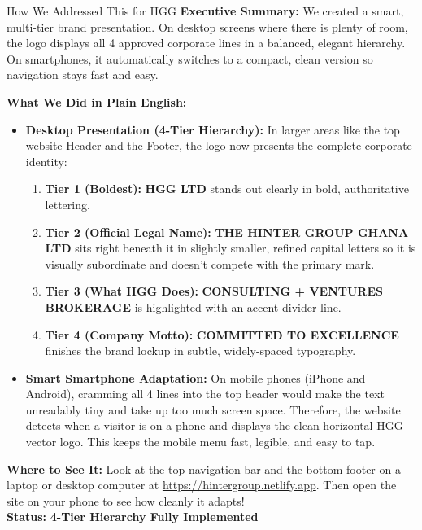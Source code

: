 \documentclass[11pt,a4paper]{article}
\begin{document}
\begin{DetailedResolutionBox}{How We Addressed This for HGG}
\textbf{Executive Summary:} We created a smart, multi-tier brand presentation. On desktop screens where there is plenty of room, the logo displays all 4 approved corporate lines in a balanced, elegant hierarchy. On smartphones, it automatically switches to a compact, clean version so navigation stays fast and easy.

\textbf{What We Did in Plain English:}
\begin{itemize}
    \item \textbf{Desktop Presentation (4-Tier Hierarchy):} In larger areas like the top website Header and the Footer, the logo now presents the complete corporate identity:
    \begin{enumerate}[noitemsep]
        \item \textbf{Tier 1 (Boldest):} \textbf{HGG LTD} stands out clearly in bold, authoritative lettering.
        \item \textbf{Tier 2 (Official Legal Name):} \textbf{THE HINTER GROUP GHANA LTD} sits right beneath it in slightly smaller, refined capital letters so it is visually subordinate and doesn't compete with the primary mark.
        \item \textbf{Tier 3 (What HGG Does):} \textbf{CONSULTING + VENTURES | BROKERAGE} is highlighted with an accent divider line.
        \item \textbf{Tier 4 (Company Motto):} \textbf{COMMITTED TO EXCELLENCE} finishes the brand lockup in subtle, widely-spaced typography.
    \end{enumerate}
    \item \textbf{Smart Smartphone Adaptation:} On mobile phones (iPhone and Android), cramming all 4 lines into the top header would make the text unreadably tiny and take up too much screen space. Therefore, the website detects when a visitor is on a phone and displays the clean horizontal HGG vector logo. This keeps the mobile menu fast, legible, and easy to tap.
\end{itemize}

\textbf{Where to See It:} Look at the top navigation bar and the bottom footer on a laptop or desktop computer at \url{https://hintergroup.netlify.app}. Then open the site on your phone to see how cleanly it adapts! \\
\textbf{Status:} \textcolor{HGGGreen}{\textbf{4-Tier Hierarchy Fully Implemented}}
\end{DetailedResolutionBox}
\end{document}
